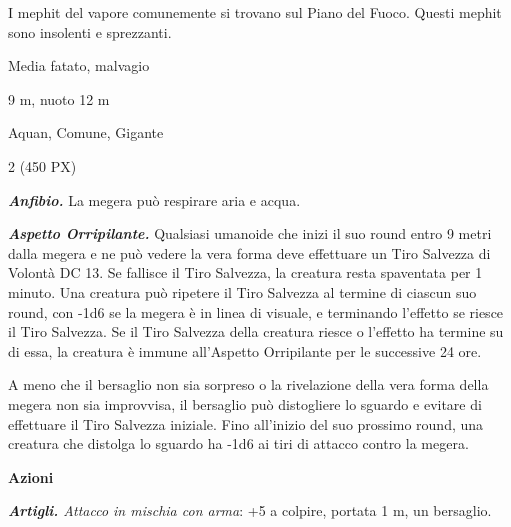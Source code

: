 \begin{multicols}{2}
{I mephit del vapore comunemente si trovano sul Piano del Fuoco. Questi mephit sono insolenti e sprezzanti.

\begin{description}[noitemsep, topsep=0pt, parsep=0pt, partopsep=0pt, itemsep=1pt, leftmargin=2.35cm,  labelwidth=2.2cm, itemindent=0cm, listparindent=0pt] %
\setlength{\baselineskip}{10pt}
\item[\textbf{Taglia/Tipo}] Media fatato, malvagio
\item[\textbf{Caratt.}] 
\item[\textbf{Punti Ferita}] 
\item[\textbf{Movimento}] 9 m, nuoto 12 m
\item[\textbf{Tiri Salvez.}] 
\item[\textbf{Sensi}] 
\item[\textbf{Linguaggi}] Aquan, Comune, Gigante
\item[\textbf{Sfida}] 2 (450 PX)
\end{description}
\smallskip

\emph{\textbf{Anfibio.}} La megera può respirare aria e acqua.

\emph{\textbf{Aspetto Orripilante.}} Qualsiasi umanoide che inizi il suo round entro 9 metri dalla megera e ne può vedere la vera forma deve effettuare un Tiro Salvezza di Volontà DC 13. Se fallisce il Tiro Salvezza, la creatura resta spaventata per 1 minuto. Una creatura può ripetere il Tiro Salvezza al termine di ciascun suo round, con -1d6 se la megera è in linea di visuale, e terminando l'effetto se riesce il Tiro Salvezza. Se il Tiro Salvezza della creatura riesce o l'effetto ha termine su di essa, la creatura è immune all'Aspetto Orripilante per le successive 24 ore.

A meno che il bersaglio non sia sorpreso o la rivelazione della vera forma della megera non sia improvvisa, il bersaglio può distogliere lo sguardo e evitare di effettuare il Tiro Salvezza iniziale. Fino all'inizio del suo prossimo round, una creatura che distolga lo sguardo ha -1d6 ai tiri di attacco contro la megera.

\textbf{Azioni}

\emph{\textbf{Artigli.} Attacco in mischia con arma}: +5 a colpire, portata 1 m, un bersaglio.

}
\end{multicols}
